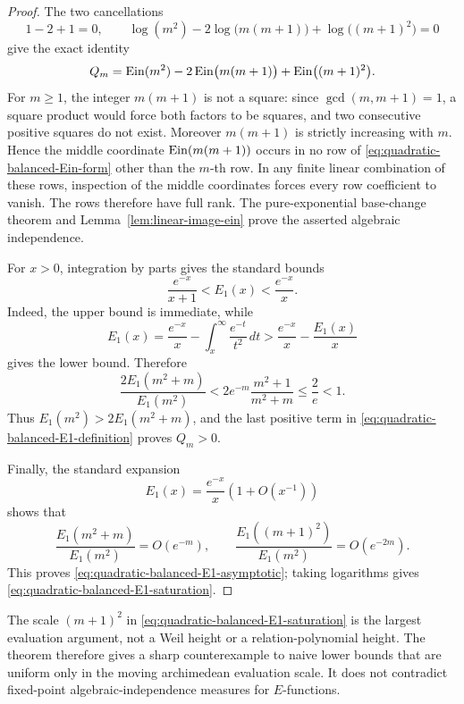 \begin{proof}
The two cancellations
\[
 1-2+1=0,
 \qquad
 \log(m^2)-2\log\bigl(m(m+1)\bigr)+\log\bigl((m+1)^2\bigr)=0
\]
give the exact identity
\begin{equation}\label{eq:quadratic-balanced-Ein-form}
 Q_m=\operatorname{Ein}(m^2)-2\operatorname{Ein}\bigl(m(m+1)\bigr)
       +\operatorname{Ein}\bigl((m+1)^2\bigr).
\end{equation}
For \(m\geq1\), the integer \(m(m+1)\) is not a square: since
\(\gcd(m,m+1)=1\), a square product would force both factors to be
squares, and two consecutive positive squares do not exist.  Moreover
\(m(m+1)\) is strictly increasing with \(m\).  Hence the middle coordinate
\(\operatorname{Ein}(m(m+1))\) occurs in no row of
\eqref{eq:quadratic-balanced-Ein-form} other than the \(m\)-th row.  In any
finite linear combination of these rows, inspection of the middle
coordinates forces every row coefficient to vanish.  The rows therefore
have full rank.  The pure-exponential base-change theorem and
Lemma~\ref{lem:linear-image-ein} prove the asserted algebraic independence.

For \(x>0\), integration by parts gives the standard bounds
\begin{equation}\label{eq:E1-two-sided-bound}
 \frac{e^{-x}}{x+1}<E_1(x)<\frac{e^{-x}}x.
\end{equation}
Indeed, the upper bound is immediate, while
\[
 E_1(x)=\frac{e^{-x}}x-\int_x^\infty\frac{e^{-t}}{t^2}\,dt
 >\frac{e^{-x}}x-\frac{E_1(x)}x
\]
gives the lower bound.  Therefore
\[
 \frac{2E_1(m^2+m)}{E_1(m^2)}
 <2e^{-m}\frac{m^2+1}{m^2+m}
 \leq\frac2e<1.
\]
Thus \(E_1(m^2)>2E_1(m^2+m)\), and the last positive term in
\eqref{eq:quadratic-balanced-E1-definition} proves \(Q_m>0\).

Finally, the standard expansion
\[
 E_1(x)=\frac{e^{-x}}x\left(1+O(x^{-1})\right)
\]
shows that
\[
 \frac{E_1(m^2+m)}{E_1(m^2)}=O(e^{-m}),
 \qquad
 \frac{E_1((m+1)^2)}{E_1(m^2)}=O(e^{-2m}).
\]
This proves \eqref{eq:quadratic-balanced-E1-asymptotic}; taking logarithms
gives \eqref{eq:quadratic-balanced-E1-saturation}.
\end{proof}

\begin{remark}
The scale \((m+1)^2\) in
\eqref{eq:quadratic-balanced-E1-saturation} is the largest evaluation
argument, not a Weil height or a relation-polynomial height.  The theorem
therefore gives a sharp counterexample to naive lower bounds that are
uniform only in the moving archimedean evaluation scale.  It does not
contradict fixed-point algebraic-independence measures for \(E\)-functions.
\end{remark}

